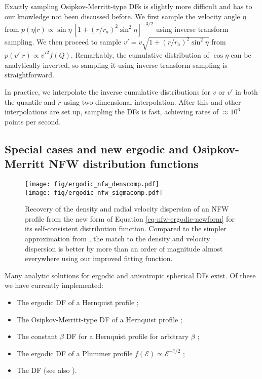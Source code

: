 Exactly sampling Osipkov-Merritt-type DFs is slightly more difficult and has to our knowledge not been discussed before. We first sample the velocity angle $\eta$ from $p(\eta|r) \propto \sin\eta\,[1+(r/r_a)^2 \sin^2\eta]^{-3/2}$ using inverse transform sampling. We then proceed to sample $v'=v\sqrt{1+(r/r_a)^2\sin^2 \eta}$ from $p(v'|r)\propto v'^2 f(Q)$. Remarkably, the cumulative distribution of $\cos \eta$ can be analytically inverted, so sampling it using inverse transform sampling is straightforward.

In practice, we interpolate the inverse cumulative distributions for $v$ or $v'$ in both the quantile and $r$ using two-dimensional interpolation. After this and other interpolations are set up, sampling the DFs is fast, achieving rates of $\approx 10^6$ points per second.

\subsection{Special cases and new ergodic and Osipkov-Merritt NFW distribution functions}

\begin{figure}
	\centering
	\texttt{[image: fig/ergodic\_nfw\_denscomp.pdf]}\\
	\texttt{[image: fig/ergodic\_nfw\_sigmacomp.pdf]}
	\caption{Recovery of the density and radial velocity dispersion of an NFW profile from the new form of Equation \eqref{eq-nfw-ergodic-newform} for its self-consistent distribution function. Compared to the simpler approximation from \citet{Widrow00a}, the match to the density and velocity dispersion is better by more than an order of magnitude almost everywhere using our improved fitting function.}
	\label{fig:ergodic_nfw}
\end{figure}

Many analytic solutions for ergodic and anisotropic spherical DFs exist. Of these we have currently implemented:
\begin{itemize}
    \item The ergodic DF of a Hernquist profile \citep{hernquist90};
    \item The Osipkov-Merritt-type DF of a Hernquist profile \citep{hernquist90};
    \item The constant $\beta$ DF for a Hernquist profile for arbitrary $\beta$ \citep{baes02};
    \item The ergodic DF of a Plummer profile $f(\mathcal{E}) \propto \mathcal{E}^{-7/2}$ \citep[e.g.,][]{binney08};
    \item The \citet{king66} DF (see also \citealt{michie63}).
\end{itemize}

